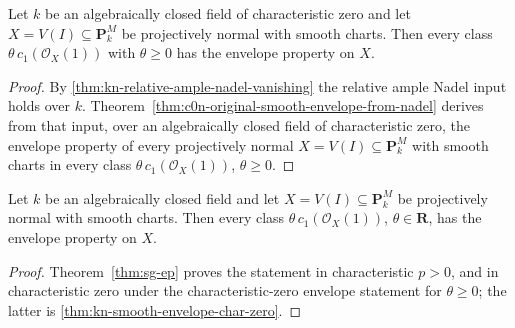 \begin{theorem}
\label{thm:kn-smooth-envelope-char-zero}
\leanok
Let $k$ be an algebraically closed field of characteristic zero and let
$X=V(I)\subseteq\mathbf P^M_k$ be projectively normal with smooth charts. Then
every class $\theta\,c_1(\mathcal O_X(1))$ with $\theta\geq0$ has the envelope
property on $X$.
\end{theorem}
\begin{proof}
By \cref{thm:kn-relative-ample-nadel-vanishing} the relative ample Nadel input
holds over $k$. Theorem~\ref{thm:c0n-original-smooth-envelope-from-nadel} derives from
that input, over an algebraically closed field of characteristic zero, the
envelope property of every projectively normal $X=V(I)\subseteq\mathbf P^M_k$
with smooth charts in every class $\theta\,c_1(\mathcal O_X(1))$,
$\theta\geq0$.
\end{proof}

\begin{corollary}
\label{cor:kn-smooth-envelope-all-characteristics}
\leanok
Let $k$ be an algebraically closed field and let $X=V(I)\subseteq\mathbf P^M_k$
be projectively normal with smooth charts. Then every class
$\theta\,c_1(\mathcal O_X(1))$, $\theta\in\mathbf R$, has the envelope property
on $X$.
\end{corollary}
\begin{proof}
Theorem~\ref{thm:sg-ep} proves the statement in characteristic $p>0$, and in
characteristic zero under the characteristic-zero envelope statement for
$\theta\geq0$; the latter is \cref{thm:kn-smooth-envelope-char-zero}.
\end{proof}
